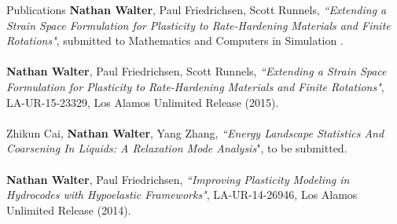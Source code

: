 \documentclass[10pt]{resume} %
\begin{document}
\begin{rSection}{Publications}
	{ \bf Nathan Walter}, Paul Friedrichsen, Scott Runnels, {\it{``Extending a Strain Space Formulation for Plasticity to Rate-Hardening Materials and Finite Rotations"}}, submitted to Mathematics and Computers in Simulation .
	\\
	\\
	{ \bf Nathan Walter}, Paul Friedrichsen, Scott Runnels, {\it{``Extending a Strain Space Formulation for Plasticity to Rate-Hardening Materials and Finite Rotations"}}, LA-UR-15-23329, Los Alamos Unlimited Release (2015).
	\\
	\\
	Zhikun Cai, {\bf Nathan Walter}, Yang Zhang, {\it ``Energy Landscape Statistics And Coarsening In Liquids: A Relaxation Mode Analysis}", to be submitted.
	\\
	\\
	{ \bf Nathan Walter}, Paul Friedrichsen, {\it{``Improving Plasticity Modeling in Hydrocodes with Hypoelastic Frameworks"}}, LA-UR-14-26946, Los Alamos Unlimited Release (2014).
	\\	
\end{rSection}
\end{document}
